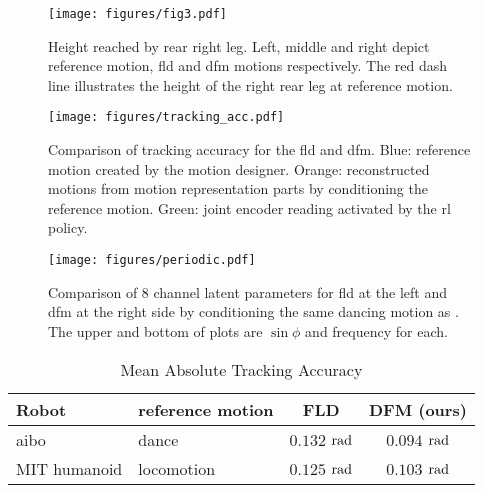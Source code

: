 \begin{figure}[t]
    \vspace{1ex}
    \centering
    \texttt{[image: figures/fig3.pdf]}
    \caption{Height reached by rear right leg. Left, middle and right depict reference motion, \ac{fld} and \ac{dfm} motions respectively. The red dash line illustrates the height of the right rear leg at reference motion.}
    \label{fig:moveup_rear_leg}
    \vspace{-1ex}
\end{figure}

\begin{figure}[t]
    \centering
    \texttt{[image: figures/tracking\_acc.pdf]}
    \caption{Comparison of tracking accuracy for the \ac{fld} and \ac{dfm}. Blue: reference motion created by the motion designer. Orange: reconstructed motions from motion representation parts by conditioning the reference motion. Green: joint encoder reading activated by the \ac{rl} policy.}
    \label{fig:joint_angle_tracking_acc}
    \vspace{-3ex}
\end{figure}


\begin{figure}[!t]
    \vspace{1ex}
    \centering
    \texttt{[image: figures/periodic.pdf]}
    \caption{Comparison of 8 channel latent parameters for \ac{fld} at the left and \ac{dfm}  at the right side by conditioning the same dancing motion as . The upper and bottom of plots are $\sin{\phi}$ and frequency for each.}
    \label{fig:latent_parameters}
\end{figure}

\begin{table}[!t]
\caption{Mean Absolute Tracking Accuracy}
\label{table:tracking_accuracy}
\begin{center}
\begin{tabular}{llcc}
\toprule
\textbf{Robot} & \textbf{reference motion} & \textbf{FLD} & \textbf{DFM (ours)} \\
\midrule
aibo & dance & $0.132$ $\rm{rad}$ & $0.094$ 
 $\rm{rad}$ \\
MIT humanoid  & locomotion &  $0.125$ $\rm{rad}$  & $0.103$ $\rm{rad}$   \\
\bottomrule
\end{tabular}
\end{center}
\vspace{-5ex}
\end{table}


